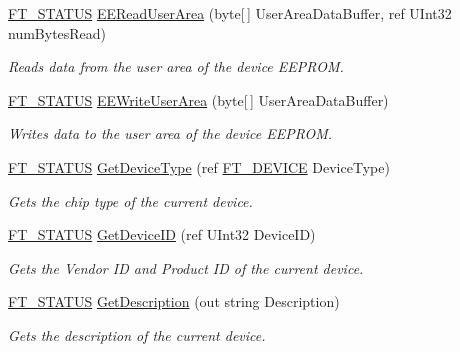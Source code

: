 \begin{DoxyCompactItemize}
\mbox{\hyperlink{class_f_t_d2_x_x___n_e_t_1_1_f_t_d_i_aabe20ad905cc4ccc1e35dd5b877d9a83}{F\+T\+\_\+\+S\+T\+A\+T\+US}} \mbox{\hyperlink{class_f_t_d2_x_x___n_e_t_1_1_f_t_d_i_ac82039e2c815fa7e9c0084aa4b40246d}{E\+E\+Read\+User\+Area}} (byte\mbox{[}$\,$\mbox{]} User\+Area\+Data\+Buffer, ref U\+Int32 num\+Bytes\+Read)
\begin{DoxyCompactList}\small\item\em Reads data from the user area of the device E\+E\+P\+R\+OM. \end{DoxyCompactList}\item 
\mbox{\hyperlink{class_f_t_d2_x_x___n_e_t_1_1_f_t_d_i_aabe20ad905cc4ccc1e35dd5b877d9a83}{F\+T\+\_\+\+S\+T\+A\+T\+US}} \mbox{\hyperlink{class_f_t_d2_x_x___n_e_t_1_1_f_t_d_i_ab1242eaf2a805bfd250039654b406fdd}{E\+E\+Write\+User\+Area}} (byte\mbox{[}$\,$\mbox{]} User\+Area\+Data\+Buffer)
\begin{DoxyCompactList}\small\item\em Writes data to the user area of the device E\+E\+P\+R\+OM. \end{DoxyCompactList}\item 
\mbox{\hyperlink{class_f_t_d2_x_x___n_e_t_1_1_f_t_d_i_aabe20ad905cc4ccc1e35dd5b877d9a83}{F\+T\+\_\+\+S\+T\+A\+T\+US}} \mbox{\hyperlink{class_f_t_d2_x_x___n_e_t_1_1_f_t_d_i_a5b346f666a9e8c58b1a0037138f8444f}{Get\+Device\+Type}} (ref \mbox{\hyperlink{class_f_t_d2_x_x___n_e_t_1_1_f_t_d_i_a7f69db13362f65d251d6b16e3eec585f}{F\+T\+\_\+\+D\+E\+V\+I\+CE}} Device\+Type)
\begin{DoxyCompactList}\small\item\em Gets the chip type of the current device. \end{DoxyCompactList}\item 
\mbox{\hyperlink{class_f_t_d2_x_x___n_e_t_1_1_f_t_d_i_aabe20ad905cc4ccc1e35dd5b877d9a83}{F\+T\+\_\+\+S\+T\+A\+T\+US}} \mbox{\hyperlink{class_f_t_d2_x_x___n_e_t_1_1_f_t_d_i_aa7646a14e37818f43d49e6d98a9a3d10}{Get\+Device\+ID}} (ref U\+Int32 Device\+ID)
\begin{DoxyCompactList}\small\item\em Gets the Vendor ID and Product ID of the current device. \end{DoxyCompactList}\item 
\mbox{\hyperlink{class_f_t_d2_x_x___n_e_t_1_1_f_t_d_i_aabe20ad905cc4ccc1e35dd5b877d9a83}{F\+T\+\_\+\+S\+T\+A\+T\+US}} \mbox{\hyperlink{class_f_t_d2_x_x___n_e_t_1_1_f_t_d_i_a3d23127003a5f51aae88c148ea87c8c5}{Get\+Description}} (out string Description)
\begin{DoxyCompactList}\small\item\em Gets the description of the current device. \end{DoxyCompactList}\item 

\end{DoxyCompactItemize}
